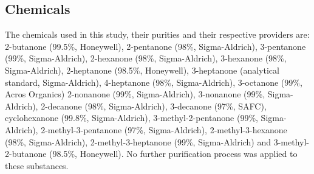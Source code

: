 \subsection{Chemicals}
The chemicals used in this study, their purities and their respective providers are:
2-butanone (99.5\%, Honeywell), 
2-pentanone (98\%, Sigma-Aldrich), 
3-pentanone (99\%, Sigma-Aldrich), 
2-hexanone (98\%, Sigma-Aldrich), 
3-hexanone (98\%, Sigma-Aldrich), 
2-heptanone (98.5\%, Honeywell), 
3-heptanone (analytical standard, Sigma-Aldrich), 
4-heptanone (98\%, Sigma-Aldrich), 
3-octanone (99\%, Acros Organics) 
2-nonanone (99\%, Sigma-Aldrich), 
3-nonanone (99\%, Sigma-Aldrich), 
2-decanone (98\%, Sigma-Aldrich), 
3-decanone (97\%, SAFC),
cyclohexanone (99.8\%, Sigma-Aldrich), 
3-methyl-2-pentanone (99\%, Sigma-Aldrich), 
2-methyl-3-pentanone (97\%, Sigma-Aldrich), 
2-methyl-3-hexanone (98\%, Sigma-Aldrich),  
2-methyl-3-heptanone (99\%, Sigma-Aldrich)
and
3-methyl-2-butanone (98.5\%, Honeywell).
No further purification process was applied to these substances.






